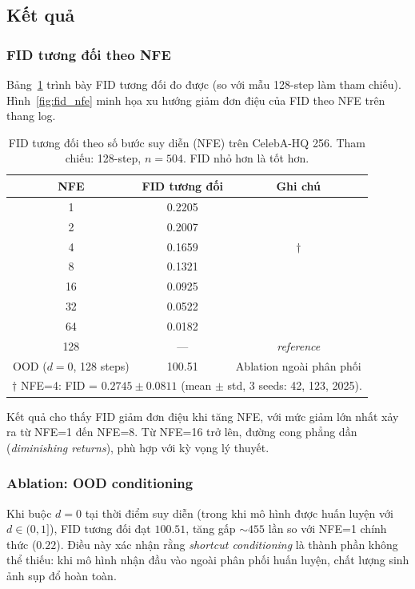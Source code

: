 \subsection{Kết quả}
\label{sec:results}

\subsubsection{FID tương đối theo NFE}

Bảng~\ref{tab:fid_relative} trình bày FID tương đối đo được (so với mẫu 128-step làm tham chiếu). Hình~\ref{fig:fid_nfe} minh họa xu hướng giảm đơn điệu của FID theo NFE trên thang log.

\begin{table}[h]
\centering
\caption{FID tương đối theo số bước suy diễn (NFE) trên CelebA-HQ 256.
Tham chiếu: 128-step, $n=504$. FID nhỏ hơn là tốt hơn.}
\label{tab:fid_relative}
\begin{tabular}{ccc}
\toprule
\textbf{NFE} & \textbf{FID tương đối} & \textbf{Ghi chú} \\
\midrule
1   & 0.2205 & \\
2   & 0.2007 & \\
4   & 0.1659 & $\dagger$ \\
8   & 0.1321 & \\
16  & 0.0925 & \\
32  & 0.0522 & \\
64  & 0.0182 & \\
128 & ---    & \textit{reference} \\
\midrule
OOD ($d=0$, 128 steps) & 100.51 & Ablation ngoài phân phối \\
\bottomrule
\multicolumn{3}{l}{\footnotesize $\dagger$ NFE=4: FID = $0.2745 \pm 0.0811$ (mean $\pm$ std, 3 seeds: 42, 123, 2025).}
\end{tabular}
\end{table}

\noindent Kết quả cho thấy FID giảm đơn điệu khi tăng NFE, với mức giảm lớn nhất xảy ra từ NFE=1 đến NFE=8. Từ NFE=16 trở lên, đường cong phẳng dần (\textit{diminishing returns}), phù hợp với kỳ vọng lý thuyết.

\subsubsection{Ablation: OOD conditioning}

Khi buộc $d = 0$ tại thời điểm suy diễn (trong khi mô hình được huấn luyện với $d \in (0,1]$), FID tương đối đạt $100.51$, tăng gấp $\sim$$455$ lần so với NFE=1 chính thức ($0.22$). Điều này xác nhận rằng \textit{shortcut conditioning} là thành phần không thể thiếu: khi mô hình nhận đầu vào ngoài phân phối huấn luyện, chất lượng sinh ảnh sụp đổ hoàn toàn.

